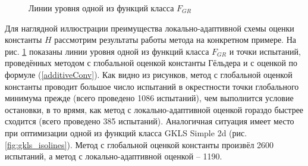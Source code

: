 \begin{figure}[ht]
    \centering
    \qquad
    \caption{Линии уровня одной из функций класса \(F_{GR}\)}
    \label{fig:grish_isolines}
\end{figure}

Для наглядной иллюстрации преимущества локально-адаптивной схемы оценки константы
\(H\) рассмотрим результаты работы метода на конкретном примере. На рис. \ref{fig:grish_isolines} показаны
линии уровня одной из функций класса \(F_{GR}\) и точки испытаний, проведённых методом с глобальной
оценкой константы Гёльдера и с оценкой по формуле (\ref{additiveConv}). Как видно из рисунков, метод с
глобальной оценкой константы проводит большое число испытаний в окрестности точки
глобального минимума прежде (всего проведено 1086 испытаний), чем выполнится условие
остановки, в то врямя, как метод с локально-адаптивной оценкой гораздо быстрее
сходится (всего проведено 385 испытаний). Аналогичная ситуация имеет место при
оптимизации одной из функций класса GKLS Simple 2d (рис. \ref{fig:gkls_isolines}). Метод с глобальной
оценкой константы произвёл 2600 испытаний, а метод с локально-адаптивной оценкой – 1190.

